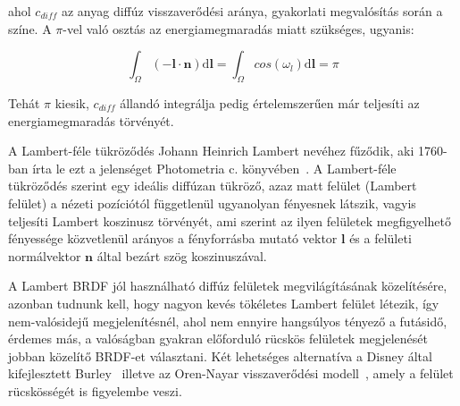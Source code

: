 ahol \(c_{diff}\) az anyag diffúz visszaverődési aránya, gyakorlati megvalósítás során a színe. A \(\pi\)-vel való osztás az energiamegmaradás miatt szükséges, ugyanis:

\[
\int_\Omega { (-\mathbf{l} \cdot \mathbf{n}) \mathrm{d}\mathbf{l} } = \int_\Omega { cos(\omega_l) \mathrm{d}\mathbf{l} } = \pi
\]

Tehát \(\pi\) kiesik, \(c_{diff}\) állandó integrálja pedig értelemszerűen már teljesíti az energiamegmaradás törvényét.

A Lambert-féle tükröződés Johann Heinrich Lambert nevéhez fűződik, aki 1760-ban írta le ezt a jelenséget Photometria c. könyvében~\cite{klett1760ih}. A Lambert-féle tükröződés szerint egy ideális diffúzan tükröző, azaz matt felület (Lambert felület) a nézeti pozíciótól függetlenül ugyanolyan fényesnek látszik, vagyis teljesíti Lambert koszinusz törvényét, ami szerint az ilyen felületek megfigyelhető fényessége közvetlenül arányos a fényforrásba mutató vektor \(\mathbf{l}\) és a felületi normálvektor \(\mathbf{n}\) által bezárt szög koszinuszával.

A Lambert BRDF jól használható diffúz felületek megvilágításának közelítésére, azonban tudnunk kell, hogy nagyon kevés tökéletes Lambert felület létezik, így nem-valósidejű megjelenítésnél, ahol nem ennyire hangsúlyos tényező a futásidő, érdemes más, a valóságban gyakran előforduló rücskös felületek megjelenését jobban közelítő BRDF-et választani. Két lehetséges alternatíva a Disney által kifejlesztett Burley~\cite{burley2012physically} illetve az Oren-Nayar visszaverődési modell~\cite{oren1994generalization}, amely a felület rücskösségét is figyelembe veszi.


